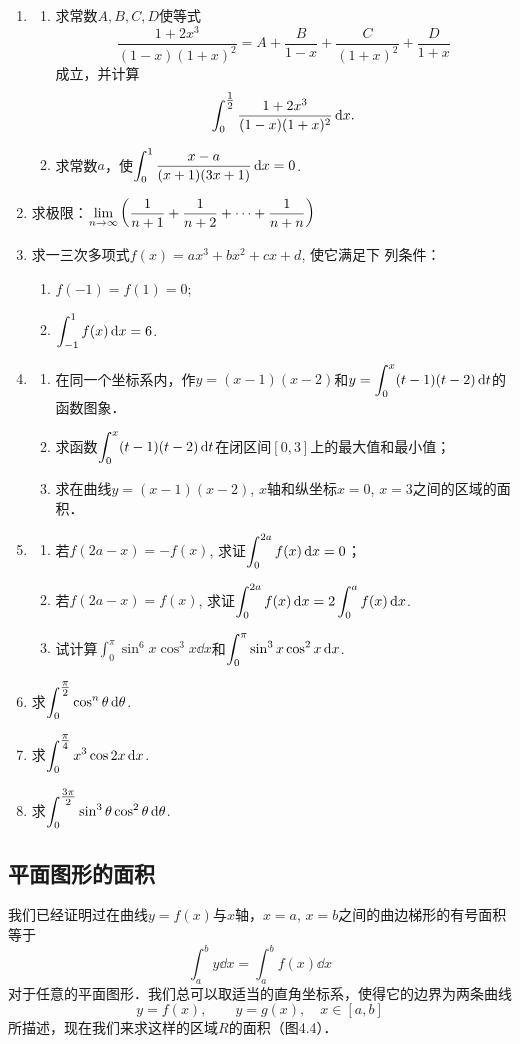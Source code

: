 \begin{ex}
\begin{enumerate}
（提示：用变量代换$x=\frac{\pi}{2}-y$.）
\item \begin{enumerate}
    \item 求常数$A,B,C,D$使等式$$\frac{1+2x^3}{(1-x)(1+x)^2}=A+\frac{B}{1-x}+\frac{C}{(1+x)^2}+\frac{D}{1+x}$$成立，并计算
    \[
    \displaystyle\int^{\tfrac{1}{2}}_0 \dfrac{1+2x^3}{(1-x)(1+x)^2}\,{\rm d} x.
    \]
    \item 求常数$a$，使$\displaystyle\int^1_0 \dfrac{x-a}{(x+1)(3x+1)}\,{\rm d} x=0$.
\end{enumerate}
\item 求极限：$\displaystyle\lim_{n\to\infty}\left(\dfrac{1}{n+1}+\dfrac{1}{n+2}+\cdots +\dfrac{1}{n+n}\right)$
\item 求一三次多项式$f(x)=ax^3+bx^2+cx+d$, 使它满足下
列条件：
\begin{enumerate}
    \item $f (-1) =f (1) =0$;
    \item $\displaystyle\int^1_{-1} f(x)\,{\rm d} x=6$.
\end{enumerate}
\item 
\begin{enumerate}
\item 在同一个坐标系内，作$y=(x-1)(x-2)$和$y=\displaystyle\int^x_0 (t-1)(t-2)\,{\rm d} t$的函数图象．
\item 求函数$\displaystyle\int^x_0 (t-1)(t-2)\,{\rm d} t$在闭区间$[0, 3]$上的最大值和最小值；
\item 求在曲线$y=(x-1)(x-2)$, $x$轴和纵坐标$x=0$, $x=3$之间的区域的面积．
\end{enumerate}
\item 
\begin{enumerate}
    \item 若$f(2a-x)=-f(x)$, 求证$\displaystyle\int^{2a}_0 f (x) \,{\rm d} x=0$；
\item 
若$f(2a-x)=f(x)$, 求证$\displaystyle\int^{2a}_0 f (x) \,{\rm d} x=2\int^a_0 f (x) \,{\rm d} x$. 
\item 试计算$\int^{\pi}_0 \sin^6 x\cos^3x\dd x$和$\displaystyle\int^{\pi}_0 \sin^3x \cos^2 x\,{\rm d} x$.
\end{enumerate}

\item 求$\displaystyle\int^{\tfrac{\pi}{2}}_0 \cos^n \theta\,{\rm d} \theta$.
\item 求$\displaystyle\int^{\tfrac{\pi}{4}}_0 x^3\cos2x\,{\rm d} x$.
\item 求$\displaystyle\int^{\tfrac{3\pi}{2}}_0 \sin^3\theta \cos^2 \theta\,{\rm d} \theta$.
\end{enumerate} 
\end{ex}

\subsection{平面图形的面积}
我们已经证明过在曲线$y=f(x)$与$x$轴，$x=a$, $x=b$之间的曲边梯形的有号面积等于
\[\int^b_a y\dd x=\int^b_a f(x)\dd x\]
对于任意的平面图形．我们总可以取适当的直角坐标系，使得它的边界为两条曲线
\[y=f (x) ,\qquad  y=g (x) ,\quad x\in [a,b]\]
所描述，现在我们来求这样的区域$R$的面积（图4.4）．

